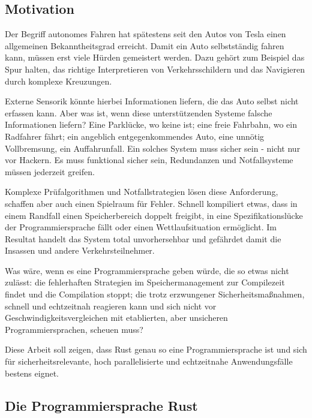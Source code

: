 \begin{multicols}{2}

\subsection*{Motivation}

Der Begriff autonomes Fahren hat spätestens seit den Autos von Tesla einen allgemeinen Bekanntheitsgrad erreicht. Damit ein Auto selbstständig fahren kann, müssen erst viele Hürden gemeistert werden.
Dazu gehört zum Beispiel das Spur halten, das richtige Interpretieren von Verkehrsschildern und das Navigieren durch komplexe Kreuzungen.

Externe Sensorik könnte hierbei Informationen liefern, die das Auto selbst nicht erfassen kann.
Aber was ist, wenn diese unterstützenden Systeme falsche Informationen liefern?
Eine Parklücke, wo keine ist; eine freie Fahrbahn, wo ein Radfahrer fährt; ein angeblich entgegenkommendes Auto, eine unnötig Vollbremsung, ein Auffahrunfall.
Ein solches System muss sicher sein - nicht nur vor Hackern.
Es muss funktional sicher sein, Redundanzen und Notfallsysteme müssen jederzeit greifen.

Komplexe Prüfalgorithmen und Notfallstrategien lösen diese Anforderung, schaffen aber auch einen Spielraum für Fehler.
Schnell kompiliert etwas, dass in einem Randfall einen Speicherbereich doppelt freigibt, in eine Spezifikationslücke der Programmiersprache fällt oder einen Wettlaufsituation ermöglicht.
Im Resultat handelt das System total unvorhersehbar und gefährdet damit die Insassen und andere Verkehrsteilnehmer.

Was wäre, wenn es eine Programmiersprache geben würde, die so etwas nicht zulässt: die fehlerhaften Strategien im Speichermanagement zur Compilezeit findet und die Compilation stoppt; die trotz erzwungener Sicherheitsmaßnahmen, schnell und echtzeitnah reagieren kann und sich nicht vor Geschwindigkeitsvergleichen mit etablierten, aber unsicheren Programmiersprachen, scheuen muss?

Diese Arbeit soll zeigen, dass Rust genau so eine Programmiersprache ist und sich für sicherheitsrelevante, hoch parallelisierte und echtzeitnahe Anwendungsfälle bestens eignet.

\subsection*{Die Programmiersprache Rust}


\end{multicols}
